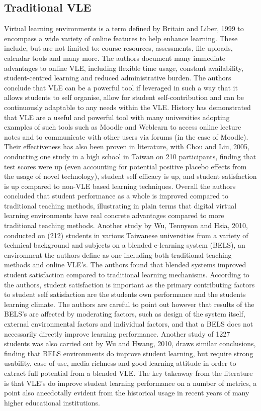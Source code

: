 \documentclass[11pt]{report}
\begin{document}
\subsection{Traditional VLE}
Virtual learning environments is a term defined by Britain and Liber, 1999\cite{Britain1999} to encompass a wide variety of online features to help enhance learning. These include, but are not limited to: course resources, assessments, file uploads, calendar tools and many more. The authors document many immediate advantages to online VLE, including flexible time usage, constant availability, student-centred learning and reduced administrative burden. The authors conclude that VLE can be a powerful tool if leveraged in such a way that it allows students to self organise, allow for student self-contribution and can be continuously adaptable to any needs within the VLE. History has demonstrated that VLE are a useful and powerful tool with many universities adopting examples of such tools such as Moodle and Weblearn to access online lecture notes and to communicate with other users via forums (in the case of Moodle). Their effectiveness has also been proven in literature, with Chou and Liu, 2005\cite{Chou2005}, conducting one study in a high school in Taiwan on 210 participants, finding that test scores were up (even accounting for potential positive placebo effects from the usage of novel technology), student self efficacy is up, and student satisfaction is up compared to non-VLE based learning techniques. Overall the authors concluded that student performance as a whole is improved compared to traditional teaching methods, illustrating in plain terms that digital virtual learning environments have real concrete advantages compared to more traditional teaching methods. Another study by Wu, Tennyson and Hsia, 2010\cite{Wu2010}, conducted on (212) students in various Taiwanese universities from a variety of technical background and subjects on a blended e-learning system (BELS), an environment the authors define as one including both traditional teaching methods and online VLE's. The authors found that blended systems improved student satisfaction compared to traditional learning mechanisms. According to the authors, student satisfaction is important as the primary contributing factors to student self satisfaction are the students own performance and the students learning climate. The authors are careful to point out however that results of the BELS's are affected by moderating factors, such as design of the system itself, external environmental factors and individual factors, and that a BELS does not necessarily directly improve learning performance. Another study of 1227 students was also carried out by Wu and Hwang, 2010\cite{Wu2010a}, draws similar conclusions, finding that BELS environments do improve student learning, but require strong usability, ease of use, media richness and good learning attitude in order to extract full potential from a blended VLE. The key takeaway from the literature is that VLE's do improve student learning performance on a number of metrics, a point also anecdotally evident from the historical usage in recent years of many higher educational institutions.
\end{document}
